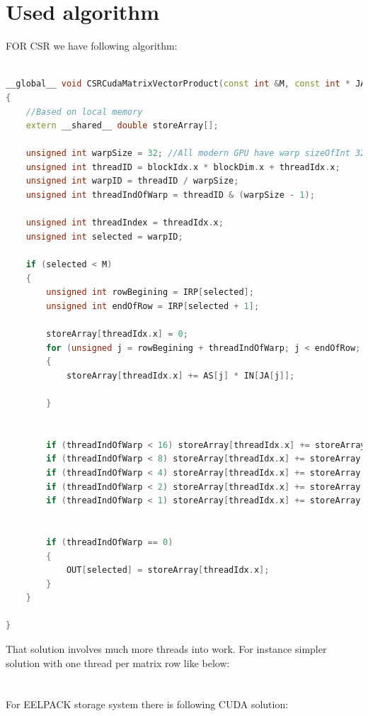 \documentclass{scrreprt}
\begin{document}
\section{Used algorithm}

FOR CSR we have following algorithm:

\begin{lstlisting}[language=C++]

__global__ void CSRCudaMatrixVectorProduct(const int &M, const int * JA, const int * IRP, const double * AS, double * IN, double * OUT)
{
	//Based on local memory
	extern __shared__ double storeArray[];

	unsigned int warpSize = 32; //All modern GPU have warp sizeOfInt 32
	unsigned int threadID = blockIdx.x * blockDim.x + threadIdx.x;
	unsigned int warpID = threadID / warpSize;
	unsigned int threadIndOfWarp = threadID & (warpSize - 1);

	unsigned int threadIndex = threadIdx.x;
	unsigned int selected = warpID;

	if (selected < M)
	{
		unsigned int rowBegining = IRP[selected];
		unsigned int endOfRow = IRP[selected + 1];

		storeArray[threadIdx.x] = 0;
		for (unsigned j = rowBegining + threadIndOfWarp; j < endOfRow; j+= warpSize)
		{
			storeArray[threadIdx.x] += AS[j] * IN[JA[j]];
		
		}


		if (threadIndOfWarp < 16) storeArray[threadIdx.x] += storeArray[threadIdx.x + 16];
		if (threadIndOfWarp < 8) storeArray[threadIdx.x] += storeArray[threadIdx.x + 8];
		if (threadIndOfWarp < 4) storeArray[threadIdx.x] += storeArray[threadIdx.x + 4];
		if (threadIndOfWarp < 2) storeArray[threadIdx.x] += storeArray[threadIdx.x + 2];
		if (threadIndOfWarp < 1) storeArray[threadIdx.x] += storeArray[threadIdx.x + 1];


		if (threadIndOfWarp == 0)
		{
			OUT[selected] = storeArray[threadIdx.x];
		}
	}	
	
}
\end{lstlisting}




That solution involves much more threads into work. For instance simpler solution with one thread per matrix row 
like below:\\\\
\\
For EELPACK storage system there is following CUDA solution:\\
\end{document}
